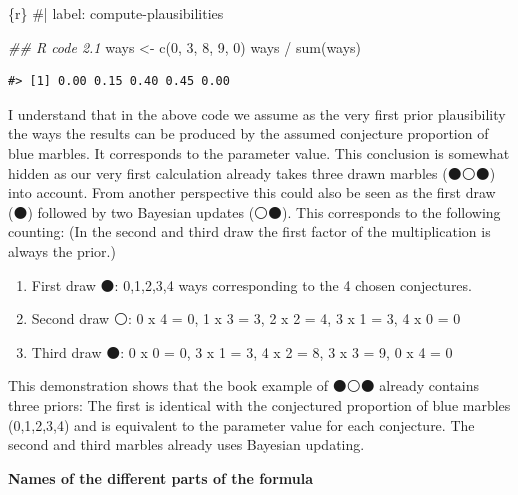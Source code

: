 \documentclass[
  letterpaper,
  DIV=11,
  numbers=noendperiod]{scrreprt}
\newenvironment{Shaded}{\begin{snugshade}}{\end{snugshade}}
\newcommand{\CommentTok}[1]{\textcolor[rgb]{0.37,0.37,0.37}{#1}}
\newcommand{\DecValTok}[1]{\textcolor[rgb]{0.68,0.00,0.00}{#1}}
\newcommand{\DocumentationTok}[1]{\textcolor[rgb]{0.37,0.37,0.37}{\textit{#1}}}
\newcommand{\FunctionTok}[1]{\textcolor[rgb]{0.28,0.35,0.67}{#1}}
\newcommand{\InformationTok}[1]{\textcolor[rgb]{0.37,0.37,0.37}{#1}}
\newcommand{\NormalTok}[1]{\textcolor[rgb]{0.00,0.23,0.31}{#1}}
\newcommand{\OtherTok}[1]{\textcolor[rgb]{0.00,0.23,0.31}{#1}}
\newcommand{\SpecialCharTok}[1]{\textcolor[rgb]{0.37,0.37,0.37}{#1}}
\providecommand{\tightlist}{%
  \setlength{\itemsep}{0pt}\setlength{\parskip}{0pt}}\usepackage{longtable,booktabs,array}
\begin{document}
\begin{Shaded}
\begin{Highlighting}[]
\InformationTok{\textasciigrave{}\textasciigrave{}\textasciigrave{}\{r\}}
\CommentTok{\#| label: compute{-}plausibilities}

\DocumentationTok{\#\# R code 2.1}
\NormalTok{ways }\OtherTok{\textless{}{-}} \FunctionTok{c}\NormalTok{(}\DecValTok{0}\NormalTok{, }\DecValTok{3}\NormalTok{, }\DecValTok{8}\NormalTok{, }\DecValTok{9}\NormalTok{, }\DecValTok{0}\NormalTok{)}
\NormalTok{ways }\SpecialCharTok{/} \FunctionTok{sum}\NormalTok{(ways)}
\InformationTok{\textasciigrave{}\textasciigrave{}\textasciigrave{}}
\end{Highlighting}
\end{Shaded}

\begin{verbatim}
#> [1] 0.00 0.15 0.40 0.45 0.00
\end{verbatim}

I understand that in the above code we assume as the very first prior
plausibility the ways the results can be produced by the assumed
conjecture proportion of blue marbles. It corresponds to the parameter
value. This conclusion is somewhat hidden as our very first calculation
already takes three drawn marbles (⚫⚪⚫) into account. From another
perspective this could also be seen as the first draw (⚫) followed by
two Bayesian updates (⚪⚫). This corresponds to the following counting:
(In the second and third draw the first factor of the multiplication is
always the prior.)

\begin{enumerate}
\def\labelenumi{\arabic{enumi}.}
\tightlist
\item
  First draw ⚫: 0,1,2,3,4 ways corresponding to the 4 chosen
  conjectures.
\item
  Second draw ⚪: 0 x 4 = 0, 1 x 3 = 3, 2 x 2 = 4, 3 x 1 = 3, 4 x 0 = 0
\item
  Third draw ⚫: 0 x 0 = 0, 3 x 1 = 3, 4 x 2 = 8, 3 x 3 = 9, 0 x 4 = 0
\end{enumerate}

This demonstration shows that the book example of ⚫⚪⚫ already
contains three priors: The first is identical with the conjectured
proportion of blue marbles (0,1,2,3,4) and is equivalent to the
parameter value for each conjecture. The second and third marbles
already uses Bayesian updating.

\textbf{Names of the different parts of the formula}
\end{document}
